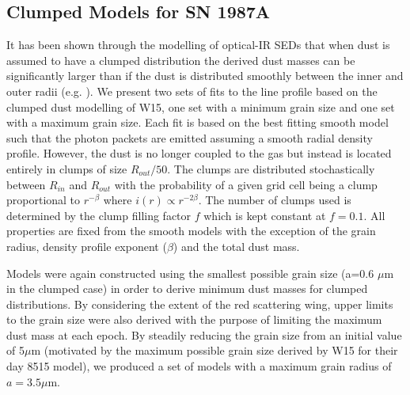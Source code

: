 \documentclass[useAMS,usenatbib,usegraphicx]{mnras}
\begin{document}


\subsection{Clumped Models for SN 1987A}
\label{clumped_models}


It has been shown through the modelling of optical-IR SEDs that when dust 
is assumed to have a clumped distribution the derived dust masses can be 
significantly larger than if the dust is distributed smoothly between the 
inner and outer radii (e.g. \citet{Owen2015}).  We present two sets of fits to the line profile based on 
the clumped dust modelling of W15, one set with a minimum grain size and one set with a maximum grain size.  Each fit is based on the best 
fitting smooth model such that the photon packets are emitted assuming a smooth 
radial density profile.  However, the dust is no longer coupled to the gas 
but instead is located entirely in clumps of size $R_{out}/50$.  The 
clumps are distributed stochastically between $R_{in}$ and $R_{out}$ with 
the probability of a given grid cell being a clump proportional to $r^{- 
\beta }$ where $i(r) \propto r^{-2 \beta}$.  The number of clumps used is 
determined by the clump filling factor $f$ which is kept constant at $f=0.1$.  All 
properties are fixed from the smooth models with the exception of the grain 
radius, density profile exponent ($\beta$) and the total dust mass.


Models were again constructed using the smallest possible grain size (a=0.6 $\mu$m in the clumped case) in order to derive minimum dust masses for clumped distributions.  By considering the extent of the red scattering wing, upper limits to the grain size were also derived with the purpose of limiting the maximum  dust mass at each epoch.  By 
steadily reducing the grain size from an initial value of 5$\mu$m 
(motivated by the maximum possible grain size derived by W15 for their day 
8515 model), we produced a set of models with a maximum grain radius of $a=3.5\mu$m.  
\end{document}

